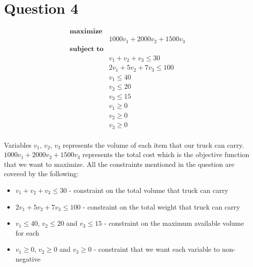 \documentclass{article}
\begin{document}
    \section*{Question 4}
    \begin{equation*}
        \begin{aligned}
            \textbf{maximize} \\
            & 1000v_1 + 2000v_2 + 1500v_3 \\
            \textbf{subject to} \\
            & v_1 + v_2 + v_3 \le 30 \\
            & 2v_1 + 5v_2 + 7v_3 \le 100 \\
            & v_1 \le 40 \\
            & v_2 \le 20 \\
            & v_3 \le 15 \\
            & v_1 \ge 0 \\
            & v_2 \ge 0 \\
            & v_3 \ge 0 \\
        \end{aligned}
    \end{equation*}

    Variables $v_1$, $v_2$, $v_3$ represents the volume of each item that our truck can carry. $1000v_1 + 2000v_2 + 1500v_3$ represents the total cost which is the objective function that we want to maximize. All the constraints mentioned in the question are covered by the following:
    \begin{itemize}
        \item $v_1 + v_2 + v_3 \le 30$ - constraint on the total volume that truck can carry
        \item $2v_1 + 5v_2 + 7v_3 \le 100$ - constraint on the total weight that truck can carry
        \item $v_1 \le 40$, $v_2 \le 20$ and $v_3 \le 15$ - constraint on the maximum available volume for each 
        \item $v_1 \ge 0$, $v_2 \ge 0$ and $v_3 \ge 0$ - constraint that we want each variable to non-negative
    \end{itemize}
\end{document}
